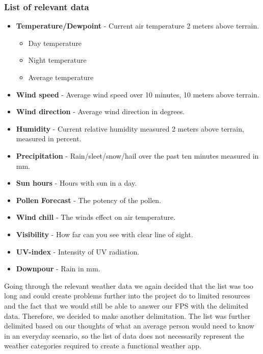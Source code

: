 

\subsubsection*{List of relevant data} %
\label{ssub:list_of_relevant_data}

\begin{itemize}
     \item \textbf{Temperature/Dewpoint} - Current air temperature 2 meters above terrain.
     \begin{itemize}
         \item Day temperature
         \item Night temperature
         \item Average temperature
     \end{itemize}
     \item \textbf{Wind speed} - Average wind speed over 10 minutes, 10 meters above terrain.
     \item \textbf{Wind direction} - Average wind direction in degrees.
     \item \textbf{Humidity} - Current relative humidity measured 2 meters above terrain, measured in percent.
     \item \textbf{Precipitation} - Rain/sleet/snow/hail over the past ten minutes measured in mm.
     \item \textbf{Sun hours} - Hours with sun in a day.
     \item \textbf{Pollen Forecast} - The potency of the pollen.
     \item \textbf{Wind chill} - The winds effect on air temperature.
     \item \textbf{Visibility} - How far can you see with clear line of sight.
     \item \textbf{UV-index} - Intensity of UV radiation.
     \item \textbf{Downpour} - Rain in mm.
 \end{itemize}

Going through the relevant weather data we again decided that the list was too long and could create problems further into the project do to limited resources and the fact that we would still be able to answer our FPS with the delimited data. 
Therefore, we decided to make another delimitation. 
The list was further delimited based on our thoughts of what an average person would need to know in an everyday scenario, so the list of data does not necessarily represent the weather categories required to create a functional weather app. 

